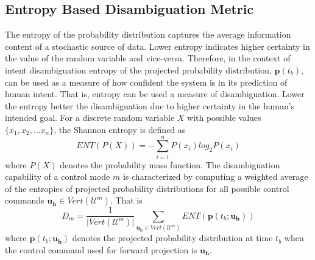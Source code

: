 \documentclass[conference]{IEEEtran}
\begin{document}
\subsection{Entropy Based Disambiguation Metric}\label{sssec:ent}
The entropy of the probability distribution captures the average information content of a stochastic source of data. Lower entropy indicates higher certainty in the value of the random variable and vice-versa. Therefore, in the context of intent disambiguation entropy of the projected probability distribution, $\boldsymbol{p}(t_b)$, can be used as a measure of how confident the system is in its prediction of human intent. That is, entropy can be used a measure of disambiguation. Lower the entropy better the disambiguation due to higher certainty in the human's intended goal. For a discrete random variable $X$ with possible values $\{x_1, x_2,\dots x_n\}$, the Shannon entropy is defined as 
\begin{equation*}
ENT(P(X)) = -\sum_{i = 1}^{n} P(x_i)log_{2}P(x_i)
\end{equation*}
where $P(X)$ denotes the probability mass function.
The disambiguation capability of a control mode $m$ is characterized by computing a weighted average of the entropies of projected probability distributions for all possible control commands $\boldsymbol{u_h} \in Vert(\mathcal{U}^m)$.
That is
\begin{equation}
D_m = \frac{1}{\vert Vert(\mathcal{U}^m) \vert}\sum_{\boldsymbol{u_h} \in Vert(\mathcal{U}^m)}  ENT(\boldsymbol{p}(t_b; \boldsymbol{u_h}))
\end{equation}
where $\boldsymbol{p}(t_b; \boldsymbol{u_h})$ denotes the projected probability distribution at time $t_b$ when the control command used for forward projection is $\boldsymbol{u_h}$.
\end{document}
